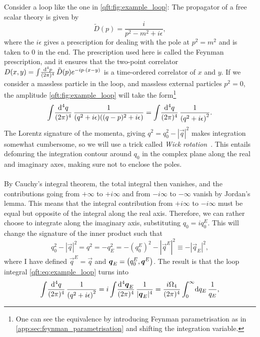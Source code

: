 \documentclass[../main.tex]{subfiles}
\begin{document}
Consider a loop like the one in \cref{qft:fig:example_loop}:
The propagator of a free scalar theory is given by~\cite{Schwartz:2014sze}
\begin{equation}
  \tilde{D}(p) = \frac{i}{p^2 - m^2 + i \epsilon},
\end{equation}
where the \(i\epsilon\) gives a prescription for dealing with the pole at \(p^2 = m^2\) and is taken to 0 in the end.
The prescription used here is called the Feynman prescription, and it ensures that the two-point correlator \(D(x,y) = \loopintegral{p}\tilde{D}(p) \exp{-ip\cdot(x-y)}\) is a time-ordered correlator of \(x\) and \(y\).
If we consider a massless particle in the loop, and massless external particles \(p^2 = 0\), the amplitude \cref{qft:fig:example_loop} will take the form\footnote{One can see the equivalence by introducing Feynman parametrisation as in \cref{app:sec:feynman_parametrisation} and shifting the integration variable.}
\begin{equation}
  \label{qft:eq:example_loop}
  \loopintegral[4]{q} \frac{1}{(q^2+i\epsilon)((q-p)^2+i\epsilon)} = \loopintegral[4]{q} \frac{1}{\pclosed{q^2 + i\epsilon}^2}.
\end{equation}
The Lorentz signature of the momenta, giving \(q^2 = q_0^2 - |\vec{q}|^2\) makes integration somewhat cumbersome, so we will use a trick called \emph{Wick rotation}~\cite{Schwartz:2014sze}.
This entails defomring the integration contour around \(q_0\) in the complex plane along the real and imaginary axes, making sure not to enclose the poles.
\\\\
By Cauchy's integral theorem, the total integral then vanishes, and the contributions going from \(+\infty\) to \(+i\infty\) and from \(-i\infty\) to \(-\infty\) vanish by Jordan's lemma.
This means that the integral contribution from \(+i\infty\) to \(-i\infty\) must be equal but opposite of the integral along the real axis.
Therefore, we can rather choose to integrate along the imaginary axis, substituting \(q_0 = iq_0^E\).
This will change the signature of the inner product such that
\begin{equation}
  q_0^2 - |\vec{q}|^2 = q^2 = -q_E^2 = -(q_0^E)^2 - |\vec{q}^E|^2 \equiv -|\vec{q}_E|^2,
\end{equation}
where I have defined \(\vec{q}^E = \vec{q}\) and \(\vec{q}_E = \pclosed{q_0^E, \vec{q}^E}\).
The result is that the loop integral \cref{qft:eq:example_loop} turns into
\begin{equation}
  \loopintegral[4]{q} \frac{1}{\pclosed{q^2 + i\epsilon}^2} = i\loopintegral[4]{\vec{q}_E} \frac{1}{|\vec{q}_E|^4} = \frac{i\Omega_4}{(2\pi)^4} \integral[_0^\infty]{q_E} \frac{1}{q_E},
\end{equation}
\end{document}
